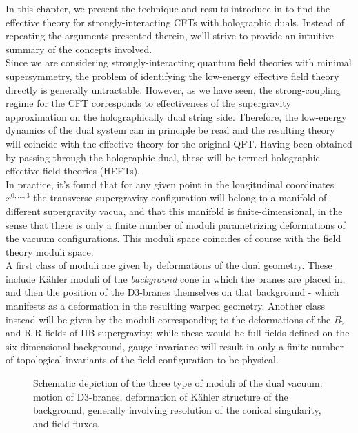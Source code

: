 
In this chapter, we present the technique and results introduce in \cite{MZ} to find the effective theory for strongly-interacting CFTs with holographic duals. Instead of repeating the arguments presented therein, we'll strive to provide an intuitive summary of the concepts involved.\\

Since we are considering strongly-interacting quantum field theories with minimal supersymmetry, the problem of identifying the low-energy effective field theory directly is generally untractable. However, as we have seen, the strong-coupling regime for the CFT corresponds to effectiveness of the supergravity approximation on the holographically dual string side. Therefore, the low-energy dynamics of the dual system can in principle be read and the resulting theory will coincide with the effective theory for the original QFT. Having been obtained by passing through the holographic dual, these will be termed holographic effective field theories (HEFTs).\\

In practice, it's found that for any given point in the longitudinal coordinates $x^{0,\ldots,3}$ the transverse supergravity configuration will belong to a manifold of different supergravity vacua, and that this manifold is finite-dimensional, in the sense that there is only a finite number of moduli parametrizing deformations of the vacuum configurations. This moduli space coincides of course with the field theory moduli space.\\

A first class of moduli are given by deformations of the dual geometry. These include K\"ahler moduli of the \emph{background} cone in which the branes are placed in, and then the position of the D3-branes themselves on that background - which manifests as a deformation in the resulting warped geometry. Another class instead will be given by the moduli corresponding to the deformations of the $B_2$ and R-R fields of IIB supergravity; while these would be full fields defined on the six-dimensional background, gauge invariance will result in only a finite number of topological invariants of the field configuration to be physical.\\


\begin{figure}
\centering
\def\svgwidth{200pt}

\caption{Schematic depiction of the three type of moduli of the dual vacuum: motion of D3-branes, deformation of K\"ahler structure of the background, generally involving resolution of the conical singularity, and field fluxes.}
\end{figure}


